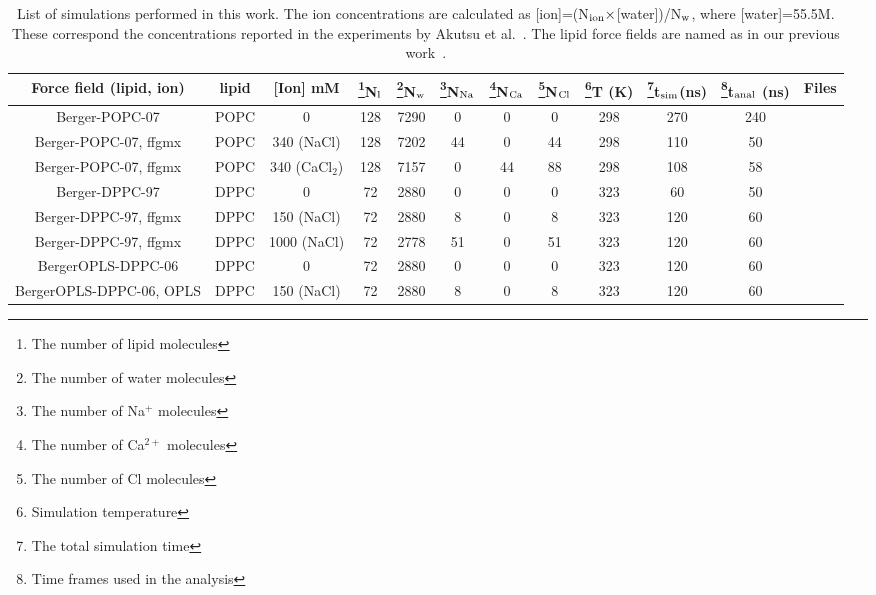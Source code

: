\documentclass[twoside,twocolumn,9pt]{article}
\begin{document}
\begin{table}
\centering
\caption{List of simulations performed in this work. The ion concentrations are calculated as 
   [ion]=(N$_{\rm ion} \times$[water])/N$_{\rm w}$, where [water]=55.5M. 
   These correspond the concentrations reported in the experiments by Akutsu et al.~\cite{akutsu81}.
   The lipid force fields are named as in our previous work~\cite{botan15}.}\label{IONsystems}
\begin{tabular}{c c c c c c c c c c c c}
  Force field (lipid, ion)& lipid & [Ion] mM & \footnote{The number of lipid molecules}N$_{\rm l}$   &  \footnote{The number of water molecules}N$_{\rm w}$   & \footnote{The number of Na$^+$ molecules}N$_{\rm Na}$  & \footnote{The number of Ca$^{2+}$ molecules}N$_{\rm Ca}$   &  \footnote{The number of Cl molecules}N$_{\rm Cl}$ & \footnote{Simulation temperature}T (K)  & \footnote{The total simulation time}t$_{{\rm sim}}$(ns) & \footnote{Time frames used in the analysis}t$_{{\rm anal}}$ (ns) & Files\\
  \hline
  Berger-POPC-07\cite{ollila07a}   &   POPC & 0          & 128 & 7290 & 0  & 0  & 0 & 298  & 270 & 240 & \cite{bergerFILESpopc}  \\
  Berger-POPC-07\cite{ollila07a}, ffgmx\cite{straatsma88}  &   POPC & 340 (NaCl) & 128 & 7202 & 44  & 0  & 44 &298  & 110 & 50 & \cite{bergerPOPC340mMNaClfiles} \\
  Berger-POPC-07\cite{ollila07a}, ffgmx\cite{straatsma88}  &   POPC & 340 (CaCl$_2$) & 128 & 7157 & 0 & 44  & 88 &298 & 108 & 58 &\cite{bergerPOPC340mMCaClfiles}  \\
  \hline
  Berger-DPPC-97\cite{marrink98}   &   DPPC & 0 & 72 & 2880 & 0  & 0  & 0 &323  & 60 & 50 &\cite{bergerDPPCfiles} \\
  Berger-DPPC-97\cite{marrink98}, ffgmx\cite{straatsma88}   &   DPPC & 150 (NaCl) & 72 & 2880 & 8  & 0  & 8 &323  & 120 & 60 &\cite{bergerDPPC150mMfiles} \\
  Berger-DPPC-97\cite{marrink98}, ffgmx\cite{straatsma88}   &   DPPC & 1000 (NaCl) & 72 & 2778 & 51  & 0  & 51 &323  & 120 & 60 &\cite{bergerDPPC1000mMfiles} \\
  \hline
  BergerOPLS-DPPC-06\cite{tieleman06} &   DPPC & 0 & 72 & 2880 & 0  & 0  & 0 &323  & 120 & 60 &\cite{bergerOPLSDPPCfiles} \\
  BergerOPLS-DPPC-06\cite{tieleman06}, OPLS\cite{aqvist90} &   DPPC & 150 (NaCl) & 72 & 2880 & 8  & 0  & 8 &323  & 120 & 60 &\cite{bergerOPLSDPPCfiles150mMnacl} \\

\end{tabular}
\end{table}
\end{document}
